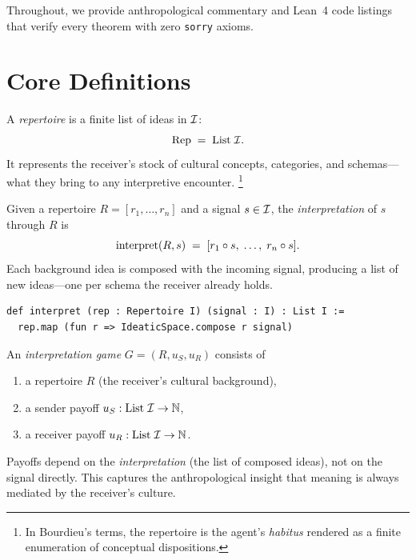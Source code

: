 Throughout, we provide anthropological commentary and Lean~4 code listings
that verify every theorem with zero \texttt{sorry} axioms.


\section{Core Definitions}
\label{sec:eq-defs}

\begin{definition}[Repertoire]
\label{def:repertoire}
A \emph{repertoire} is a finite list of ideas in $\mathcal{I}$:
\[
  \mathrm{Rep} \;=\; \mathrm{List}\;\mathcal{I}.
\]
It represents the receiver's stock of cultural concepts, categories, and
schemas---what they bring to any interpretive encounter.%
\footnote{In Bourdieu's terms, the repertoire is the agent's \emph{habitus}
rendered as a finite enumeration of conceptual dispositions.}
\end{definition}

\begin{definition}[Interpretation]
\label{def:interpret}
Given a repertoire $R = [r_1,\dots,r_n]$ and a signal $s\in\mathcal{I}$, the
\emph{interpretation} of $s$ through $R$ is
\[
  \mathrm{interpret}(R, s) \;=\; [r_1\circ s,\;\dots,\;r_n\circ s].
\]
Each background idea is composed with the incoming signal, producing a list
of new ideas---one per schema the receiver already holds.
\end{definition}

\begin{lstlisting}[caption={Interpretation in Lean~4.}]
def interpret (rep : Repertoire I) (signal : I) : List I :=
  rep.map (fun r => IdeaticSpace.compose r signal)
\end{lstlisting}

\begin{definition}
\label{def:interp-game}
An \emph{interpretation game} $G = (R, u_S, u_R)$ consists of
\begin{enumerate}
  \item a repertoire $R$ (the receiver's cultural background),
  \item a sender payoff $u_S : \mathrm{List}\;\mathcal{I} \to \mathbb{N}$,
  \item a receiver payoff $u_R : \mathrm{List}\;\mathcal{I} \to \mathbb{N}$.
\end{enumerate}
Payoffs depend on the \emph{interpretation} (the list of composed ideas),
not on the signal directly.  This captures the anthropological insight that
meaning is always mediated by the receiver's culture.
\end{definition}

